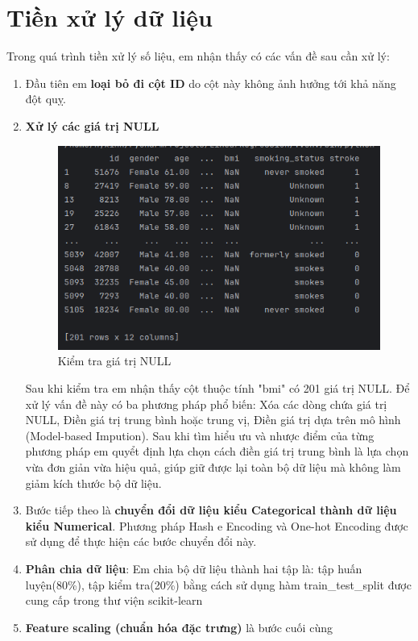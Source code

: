 \documentclass[11pt]{article}
\begin{document}
	\pagebreak
	
	\section{Tiền xử lý dữ liệu}
	
	Trong quá trình tiền xử lý số liệu, em nhận thấy có các vấn đề sau cần xử lý:
	\begin{enumerate}
		\item Đầu tiên em \textbf{loại bỏ đi cột ID} do cột này không ảnh hưởng tới khả năng đột quỵ.
		\item
		\textbf{Xử lý các giá trị NULL}
		\begin{figure}[H]
			\centering
			\includegraphics[width=0.7\linewidth]{nullCheck}
			\caption{Kiểm tra giá trị NULL}
			\label{fig:nullcheck}
		\end{figure}
		Sau khi kiểm tra em nhận thấy cột thuộc tính "bmi" có 201 giá trị NULL. Để xử lý vấn đề này có ba phương pháp phổ biến: Xóa các dòng chứa giá trị NULL, Điền giá trị trung bình hoặc trung vị, Điền giá trị dựa trên mô hình (Model-based Impution).
		Sau khi tìm hiểu ưu và nhược điểm của từng phương pháp em quyểt định lựa chọn cách điền giá trị trung bình là lựa chọn vừa đơn giản vừa hiệu quả, giúp giữ được lại toàn bộ dữ liệu mà không làm giảm kích thước bộ dữ liệu.
		\item Bước tiếp theo là \textbf{chuyển đổi dữ liệu kiểu Categorical thành dữ liệu kiểu Numerical}. Phương pháp Hash e Encoding và One-hot Encoding được sử dụng để thực hiện các bước chuyển đổi này.
		\item \textbf{Phân chia dữ liệu}: Em chia bộ dữ liệu thành hai tập là: tập huấn luyện(80\%), tập kiểm tra(20\%) bằng cách sử dụng hàm train\_test\_split được cung cấp trong thư viện scikit-learn
		\item \textbf{Feature scaling (chuẩn hóa đặc trưng)} là bước cuối cùng
	\end{enumerate}
	\pagebreak
	
\end{document}
